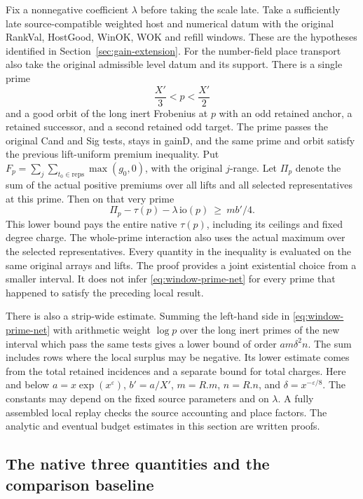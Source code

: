 \documentclass[12pt,letterpaper]{article}
\DeclareRobustCommand{\id}[1]{\mbox{\small\ttfamily #1}}
\begin{document}
Fix a nonnegative coefficient \(\lambda\) before taking the scale late. Take a sufficiently late source-compatible weighted host and numerical datum with the original \id{RankVal}, \id{HostGood}, \id{WinOK}, \id{WOK} and refill windows. These are the hypotheses identified in Section~\ref{sec:gain-extension}. For the number-field place transport also take the original admissible level datum and its support. There is a single prime
\[
                \frac{X'}3 < p < \frac{X'}2
\]
and a good orbit of the long inert Frobenius at \(p\) with an odd retained anchor, a retained successor, and a second retained odd target. The prime passes the original \id{Cand} and \id{Sig} tests, stays in \id{gainD}, and the same prime and orbit satisfy the previous lift-uniform premium inequality. Put \(F_p=\sum_j\sum_{t_0\in\mathrm{reps}}\max(g_0,0)\), with the original \(j\)-range. Let \(\Pi_p\) denote the sum of the actual positive premiums over all lifts and all selected representatives at this prime. Then on that very prime
\begin{equation}
       \Pi_p-\tau(p)-\lambda\,\mathrm{io}(p)\ \ge\ m b'/4.
       \label{eq:window-prime-net}
\end{equation}
This lower bound pays the entire native \(\tau(p)\), including its ceilings and fixed degree charge. The whole-prime interaction also uses the actual maximum over the selected representatives. Every quantity in the inequality is evaluated on the same original arrays and lifts. The proof provides a joint existential choice from a smaller interval. It does not infer \eqref{eq:window-prime-net} for every prime that happened to satisfy the preceding local result.

There is also a strip-wide estimate. Summing the left-hand side in \eqref{eq:window-prime-net} with arithmetic weight \(\log p\) over the long inert primes of the new interval which pass the same tests gives a lower bound of order \(a m\delta^2 n\). The sum includes rows where the local surplus may be negative. Its lower estimate comes from the total retained incidences and a separate bound for total charges. Here and below \(a=x\exp(x^\varepsilon)\), \(b'=a/X'\), \(m=R.m\), \(n=R.n\), and \(\delta=x^{-\varepsilon/8}\). The constants may depend on the fixed source parameters and on \(\lambda\). A fully assembled local replay checks the source accounting and place factors. The analytic and eventual budget estimates in this section are written proofs.

\subsection{The native three quantities and the comparison baseline}
\end{document}

